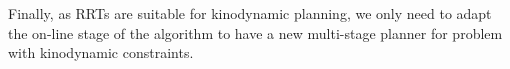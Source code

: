 \documentclass[10pt, conference, compsoc]{IEEEtran}
\begin{document}
Finally, as RRTs are suitable for kinodynamic planning, we only need to adapt
the on-line stage of the algorithm to have a new multi-stage planner for problem
with kinodynamic constraints.






%
%



%
%
\end{document}
